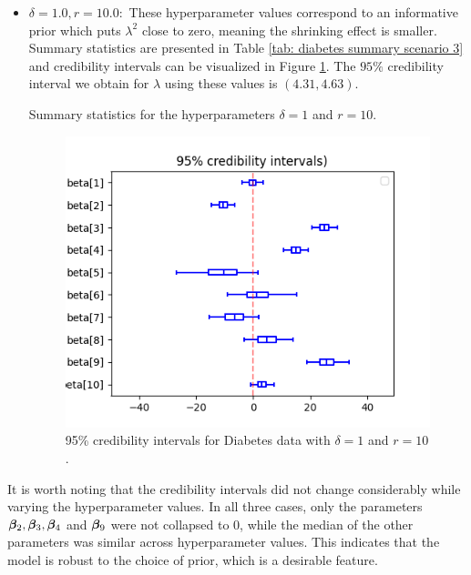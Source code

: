 \documentclass[a4paper, 10pt]{article}
\begin{document}
\begin{itemize}
    \item $ \delta = 1.0, r = 10.0: $
    These hyperparameter values correspond to an informative prior which puts $ \lambda^2 $ close to zero, meaning the shrinking effect is smaller.
    Summary statistics are presented in Table \ref{tab: diabetes summary scenario 3} and credibility intervals can be visualized in Figure \ref{fig: diabetes credibility scenario 3}.
    The $ 95\% $ credibility interval we obtain for $ \lambda $ using these values is $ ( 4.31, 4.63 ) $.
    \begin{table}[htb]
        \centering
        
        \caption{Summary statistics for the hyperparameters $ \delta = 1 $ and $ r = 10 $.}
        \label{tab: diabetes summary scenario 3}
    \end{table}
\begin{figure}
    \centering
    \includegraphics[width=.6\textwidth]{../outputs/diabetes_data/scenario_3/credibility_intervals.png}
    \caption{95\% credibility intervals for Diabetes data with $ \delta = 1 $ and $ r = 10 $.}
    \label{fig: diabetes credibility scenario 3}
\end{figure}
\end{itemize}
It is worth noting that the credibility intervals did not change considerably while varying the hyperparameter values.
In all three cases, only the parameters $ \boldsymbol{\beta}_{ 2 }, \boldsymbol{\beta}_{ 3 }, \boldsymbol{\beta}_{ 4 } $ and $ \boldsymbol{\beta}_{ 9 } $ were not collapsed to $ 0 $, while the median of the other parameters was similar across hyperparameter values.
This indicates that the model is robust to the choice of prior, which is a desirable feature.


\printbibliography
\end{document}
